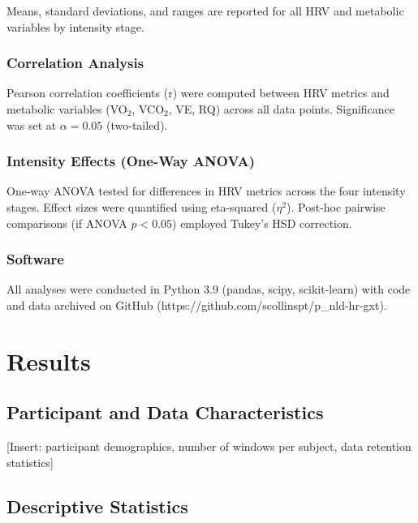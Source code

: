\documentclass[12pt,a4paper]{article}
\begin{document}
Means, standard deviations, and ranges are reported for all HRV and metabolic variables by intensity stage.

\subsubsection*{Correlation Analysis}

Pearson correlation coefficients (r) were computed between HRV metrics and metabolic variables (VO$_2$, VCO$_2$, VE, RQ) across all data points. Significance was set at $\alpha = 0.05$ (two-tailed).

\subsubsection*{Intensity Effects (One-Way ANOVA)}

One-way ANOVA tested for differences in HRV metrics across the four intensity stages. Effect sizes were quantified using eta-squared ($\eta^2$). Post-hoc pairwise comparisons (if ANOVA $p < 0.05$) employed Tukey's HSD correction.

\subsubsection*{Software}

All analyses were conducted in Python 3.9 (pandas, scipy, scikit-learn) with code and data archived on GitHub (https://github.com/scollinspt/p\_nld-hr-gxt).


\section*{Results}

\subsection*{Participant and Data Characteristics}

[Insert: participant demographics, number of windows per subject, data retention statistics]

\subsection*{Descriptive Statistics}
\end{document}
